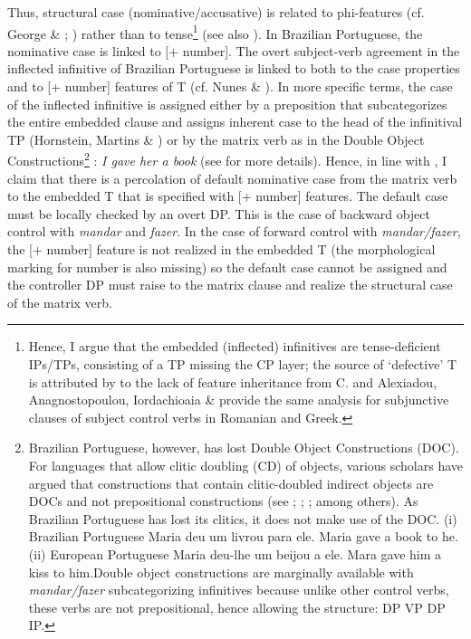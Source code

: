 \documentclass[output=paper]{langsci/langscibook}
\begin{document}
Thus, structural case (nominative/accusative) is related to phi-features (cf. George \& \citealt{Kornfilt1981}; \citealt{Sitaridou2006}) rather than to tense\footnote{Hence, I argue that the embedded (inflected) infinitives are tense-deficient IPs/TPs, consisting of a TP missing the CP layer; the source of ‘defective’ T is attributed by \citet{Chomsky2008} to the lack of feature inheritance from C. \citet{Alboiu2007} and Alexiadou, Anagnostopoulou, Iordachioaia \& \citet{Marchis2010} provide the same analysis for subjunctive clauses of subject control verbs in Romanian and Greek.} (see also \citealt{Pires2010}). In Brazilian Portuguese, the nominative case is linked to [+ number]. The overt subject-verb agreement in the inflected infinitive of Brazilian Portuguese is linked to both to the case properties and to [+ number] features of T (cf. Nunes \& \citealt{Raposo1998}). In more specific terms, the case of the inflected infinitive is assigned either by a preposition that subcategorizes the entire embedded clause and assigns inherent case to the head of the infinitival TP (Hornstein, Martins \& \citealt{Nunes2008}) or by the matrix verb as in the Double Object Constructions\footnote{Brazilian Portuguese, however, has lost Double Object Constructions (DOC). For languages that allow clitic doubling (CD) of objects, various scholars have argued that constructions that contain clitic-doubled indirect objects are DOCs and not prepositional constructions (see \citealt{Demonte1995}; \citealt{Bleam1999}; \citealt{Anagnostopoulou2003}; among others). As Brazilian Portuguese has lost its clitics, it does not make use of the DOC. (i)  Brazilian Portuguese Maria deu   um livrou para ele.            Maria gave a     book  to      he.(ii)  European Portuguese  Maria deu-lhe   um beijou a  ele.            Mara  gave him a    kiss    to him.Double object constructions are marginally available with \textit{mandar/fazer} subcategorizing infinitives because unlike other control verbs, these verbs are not prepositional, hence allowing the structure: DP VP DP IP.} : \textit{I gave her a book} (see \citealt{Larson1991} for more details). Hence, in line with \citet{Raposo1987}, I claim that there is a percolation of default nominative case from the matrix verb to the embedded T that is specified with [+ number] features. The default case must be locally checked by an overt DP. This is the case of backward object control with \textit{mandar} and \textit{fazer}. In the case of forward control with \textit{mandar/fazer}, the [+ number] feature is not realized in the embedded T (the morphological marking for number is also missing) so the default case cannot be assigned and the controller DP must raise to the matrix clause and realize the structural case of the matrix verb.
\end{document}
